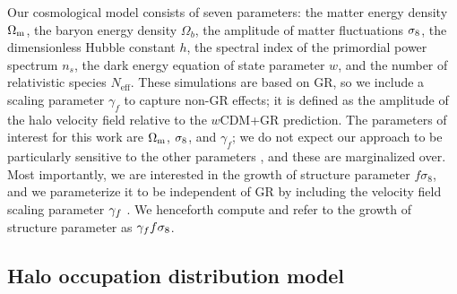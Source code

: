 Our cosmological model consists of seven parameters: the matter energy density $\Omega_\mathrm{m}$, the baryon energy density $\Omega_{b}$, the amplitude of matter fluctuations $\sigma_\mathrm{8}$, the dimensionless Hubble constant $h$, the spectral index of the primordial power spectrum $n_{s}$, the dark energy equation of state parameter $w$, and the number of relativistic species $N_{\text{eff}}$.
These simulations are based on GR, so we include a scaling parameter $\gamma_f$ to capture non-GR effects; it is defined as the amplitude of the halo velocity field relative to the $w$CDM+GR prediction.
The parameters of interest for this work are $\Omega_\mathrm{m}$, $\sigma_\mathrm{8}$, and $\gamma_f$; we do not expect our approach to be particularly sensitive to the other parameters \citep{Zhai2019}, and these are marginalized over.
Most importantly, we are interested in the growth of structure parameter $f \sigma_8$, and we parameterize it to be independent of GR by including the velocity field scaling parameter $\gamma_f$ \citep{Reid2014}.
We henceforth compute and refer to the growth of structure parameter as $\gamma_f f\sigma_8$.


\subsection{Halo occupation distribution model}
\label{sec:hod}

